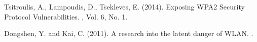 \documentclass[12pt, titlepage]{article}
\begin{document}
\begin{thebibliography}{}

Tsitroulis, A., Lampoudis, D., Tsekleves, E.
\newblock (2014).
\newblock Exposing WPA2 Security Protocol Vulnerabilities.
, Vol. 6, No. 1.

Dongshen, Y. and Kai, C. 
\newblock (2011).
\newblock A research into the latent danger of WLAN.
.

\end{thebibliography}
\end{document}
